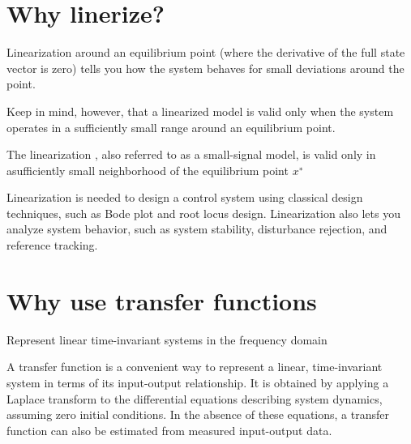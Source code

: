 \section{Why linerize?}
Linearization around an equilibrium point (where the derivative of the full state vector is zero) tells you how the system behaves for small deviations around the point.

Keep in mind, however, that a linearized model is valid
only when the system operates in a sufficiently small range around an equilibrium point.

The linearization , also referred to as a small-signal model, is valid only in asufficiently small neighborhood of the equilibrium point $x^∗$

Linearization is needed to design a control system using classical design techniques, such as Bode plot and root locus design. Linearization also lets you analyze system behavior, such as system stability, disturbance rejection, and reference tracking.




\section{Why use transfer functions}
Represent linear time-invariant systems in the frequency domain

A transfer function is a convenient way to represent a linear, time-invariant system in terms of its input-output relationship. It is obtained by applying a Laplace transform to the differential equations describing system dynamics, assuming zero initial conditions. In the absence of these equations, a transfer function can also be estimated from measured input-output data.

